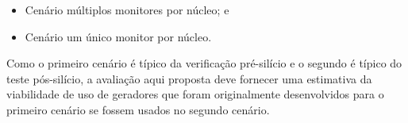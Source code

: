 \begin{itemize}
    \item Cenário múltiplos monitores por núcleo; e
    \item Cenário um único monitor por núcleo.
\end{itemize}

Como o primeiro cenário é típico da verificação pré-silício e o segundo é
típico do teste pós-silício, a avaliação aqui proposta deve fornecer uma
estimativa da viabilidade de uso de geradores que foram originalmente
desenvolvidos para o primeiro cenário se fossem usados no segundo cenário.
